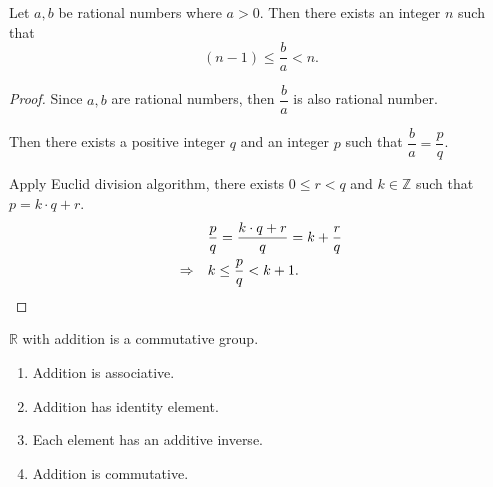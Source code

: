 \begin{lemma}
    \par Let $a, b$ be rational numbers where $a > 0$. Then there exists an integer $n$ such that
    \[
        (n - 1)\le \frac{b}{a} < n.
    \]
\end{lemma}

\begin{proof}
    \par Since $a, b$ are rational numbers, then $\dfrac{b}{a}$ is also rational number.
    \par Then there exists a positive integer $q$ and an integer $p$ such that $\dfrac{b}{a} = \dfrac{p}{q}$.
    \par Apply Euclid division algorithm, there exists $0\le r < q$ and $k\in\mathbb{Z}$ such that $p = k\cdot q + r$.
    \begin{align*}
                         & \frac{p}{q} = \frac{k\cdot q + r}{q} = k + \frac{r}{q} \\
        \Rightarrow\quad & k \le \frac{p}{q} < k + 1.\qedhere
    \end{align*}
\end{proof}

\begin{theorem}\label{theorem:real-field-part-one}
    \par $\mathbb{R}$ with addition is a commutative group.
    \begin{enumerate}[label={(F\arabic*)}]
        \item Addition is associative.
        \item Addition has identity element.
        \item Each element has an additive inverse.
        \item Addition is commutative.
    \end{enumerate}
\end{theorem}

